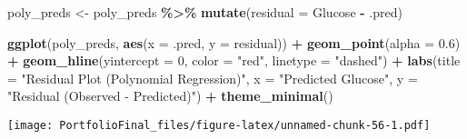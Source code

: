 \documentclass[
]{article}
\newenvironment{Shaded}{\begin{snugshade}}{\end{snugshade}}
\newcommand{\AttributeTok}[1]{\textcolor[rgb]{0.13,0.29,0.53}{#1}}
\newcommand{\DecValTok}[1]{\textcolor[rgb]{0.00,0.00,0.81}{#1}}
\newcommand{\FloatTok}[1]{\textcolor[rgb]{0.00,0.00,0.81}{#1}}
\newcommand{\FunctionTok}[1]{\textcolor[rgb]{0.13,0.29,0.53}{\textbf{#1}}}
\newcommand{\NormalTok}[1]{#1}
\newcommand{\OtherTok}[1]{\textcolor[rgb]{0.56,0.35,0.01}{#1}}
\newcommand{\SpecialCharTok}[1]{\textcolor[rgb]{0.81,0.36,0.00}{\textbf{#1}}}
\newcommand{\StringTok}[1]{\textcolor[rgb]{0.31,0.60,0.02}{#1}}
\begin{document}
\begin{Shaded}
\begin{Highlighting}[]
\NormalTok{poly\_preds }\OtherTok{\textless{}{-}}\NormalTok{ poly\_preds }\SpecialCharTok{\%\textgreater{}\%}
  \FunctionTok{mutate}\NormalTok{(}\AttributeTok{residual =}\NormalTok{ Glucose }\SpecialCharTok{{-}}\NormalTok{ .pred)}

\FunctionTok{ggplot}\NormalTok{(poly\_preds, }\FunctionTok{aes}\NormalTok{(}\AttributeTok{x =}\NormalTok{ .pred, }\AttributeTok{y =}\NormalTok{ residual)) }\SpecialCharTok{+}
  \FunctionTok{geom\_point}\NormalTok{(}\AttributeTok{alpha =} \FloatTok{0.6}\NormalTok{) }\SpecialCharTok{+}
  \FunctionTok{geom\_hline}\NormalTok{(}\AttributeTok{yintercept =} \DecValTok{0}\NormalTok{, }\AttributeTok{color =} \StringTok{"red"}\NormalTok{, }\AttributeTok{linetype =} \StringTok{"dashed"}\NormalTok{) }\SpecialCharTok{+}
  \FunctionTok{labs}\NormalTok{(}\AttributeTok{title =} \StringTok{"Residual Plot (Polynomial Regression)"}\NormalTok{,}
       \AttributeTok{x =} \StringTok{"Predicted Glucose"}\NormalTok{,}
       \AttributeTok{y =} \StringTok{"Residual (Observed {-} Predicted)"}\NormalTok{) }\SpecialCharTok{+}
  \FunctionTok{theme\_minimal}\NormalTok{()}
\end{Highlighting}
\end{Shaded}

\texttt{[image: PortfolioFinal\_files/figure-latex/unnamed-chunk-56-1.pdf]}
\end{document}
